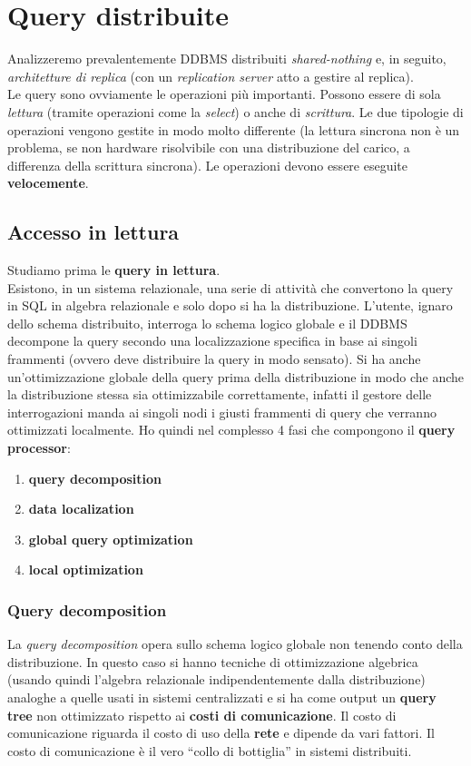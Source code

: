 \documentclass[a4paper,12pt, oneside]{book}
\begin{document}
\section{Query distribuite}
Analizzeremo prevalentemente DDBMS distribuiti \textit{shared-nothing} e, in
seguito, \textit{architetture di replica} (con un \textit{replication server}
atto a gestire al replica).\\
Le query sono ovviamente le operazioni più importanti. Possono essere di sola
\textit{lettura} (tramite operazioni come la \textit{select}) o anche di
\textit{scrittura}. Le due tipologie di operazioni vengono gestite in modo
molto differente (la lettura sincrona non è un problema, se non hardware
risolvibile con una distribuzione del carico, a differenza della scrittura
sincrona). Le operazioni devono essere eseguite \textbf{velocemente}.
\subsection{Accesso in lettura}
Studiamo prima le \textbf{query in lettura}.\\
Esistono, in un sistema relazionale, una serie di attività che convertono la
query in SQL in algebra relazionale e solo dopo si ha la distribuzione. 
L'utente, ignaro dello schema distribuito, interroga lo schema
logico globale e il DDBMS decompone la query secondo una localizzazione
specifica in base ai singoli frammenti (ovvero deve distribuire la query in modo
sensato). Si ha anche un'ottimizzazione globale della query prima della
distribuzione in modo che anche la distribuzione stessa sia ottimizzabile
correttamente, infatti il gestore delle interrogazioni manda ai singoli nodi i
giusti frammenti di query che verranno ottimizzati localmente. Ho quindi nel
complesso 4 fasi che compongono il \textbf{query processor}:
\begin{enumerate}
  \item \textbf{query decomposition}
  \item \textbf{data localization}
  \item \textbf{global query optimization}
  \item \textbf{local optimization}
\end{enumerate}
\subsubsection{Query decomposition}
La \textit{query decomposition} opera sullo schema logico globale non tenendo
conto della distribuzione. In questo caso si hanno tecniche di ottimizzazione
algebrica (usando quindi l'algebra relazionale indipendentemente dalla
distribuzione) analoghe a quelle usati in sistemi centralizzati e si ha come
output un \textbf{query tree} non ottimizzato rispetto ai \textbf{costi di
comunicazione}. Il costo di comunicazione riguarda il costo di uso della
\textbf{rete} e dipende da vari fattori. Il costo di comunicazione è il vero
``collo di bottiglia'' in sistemi distribuiti.
\end{document}
